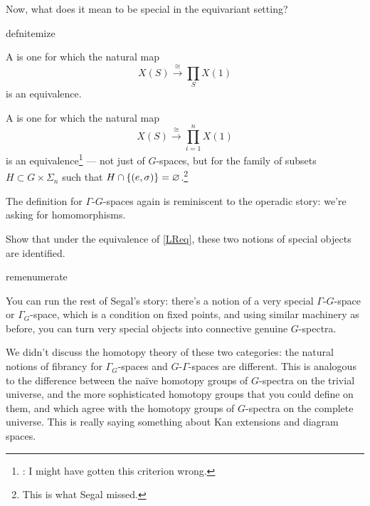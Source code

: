 Now, what does it mean to be special in the equivariant setting?
\begin{comp}{defn}{itemize}
	\item A  is one for which the natural map
	\[X(S)\stackrel\cong\longrightarrow \prod_S X(1)\]
	is an equivalence.
	\item A  is one for which the natural map
	\[X(S)\stackrel\cong\longrightarrow \prod_{i=1}^n X(1)\] 
	is an equivalence\footnote{\TODO: I might have gotten this criterion wrong.} --- not just of $G$-spaces, but
	for the family of subsets $H\subset G\times\Sigma_n$ such that $H\cap\{(e,\sigma)\} =
	\varnothing$.\footnote{This is what Segal missed.}
\end{comp}
The definition for $\Gamma$-$G$-spaces again is reminiscent to the operadic story: we're asking for homomorphisms.
\begin{ex}
Show that under the equivalence of \cref{LReq}, these two notions of special objects are identified.
\end{ex}
\begin{comp}{rem}{enumerate}
	\item You can run the rest of Segal's story: there's a notion of a very special $\Gamma$-$G$-space or
	$\Gamma_G$-space, which is a condition on fixed points, and using similar machinery as before, you can turn
	very special objects into connective genuine $G$-spectra.
	\item We didn't discuss the homotopy theory of these two categories: the natural notions of fibrancy for
	$\Gamma_G$-spaces and $G$-$\Gamma$-spaces are different. This is analogous to the difference between the naïve
	homotopy groups of $G$-spectra on the trivial universe, and the more sophisticated homotopy groups that you
	could define on them, and which agree with the homotopy groups of $G$-spectra on the complete universe. This
	is really saying something about Kan extensions and diagram spaces. \qedhere
\end{comp}
